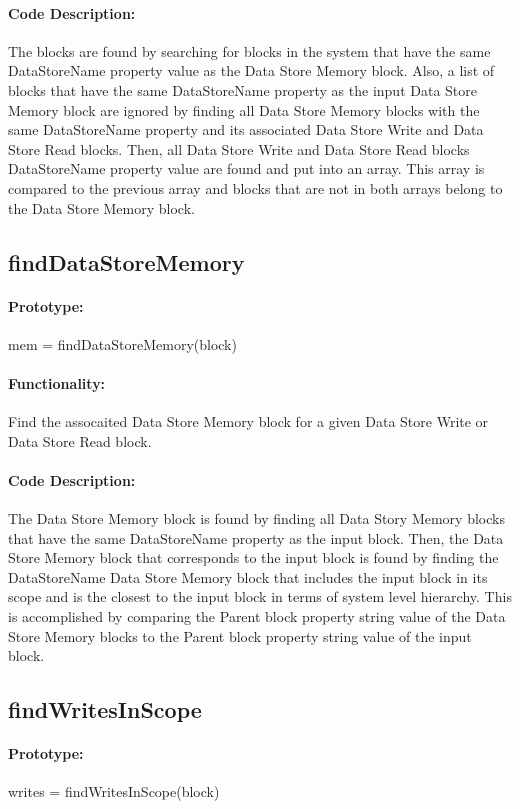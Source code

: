 \documentclass[12pt,letterpaper]{report}
\begin{document}
\paragraph{Code Description:} The blocks are found by searching for blocks in the system that have the same DataStoreName property value as the Data Store Memory block. Also, a list of blocks that have the same DataStoreName property as the input Data Store Memory block are ignored by finding all Data Store Memory blocks with the same DataStoreName property and its associated Data Store Write and Data Store Read blocks. Then, all Data Store Write and Data Store Read blocks DataStoreName property value are found and put into an array. This array is compared to the previous array and blocks that are not in both arrays belong to the Data Store Memory block.

\subsection{findDataStoreMemory}
\paragraph{Prototype:} mem = findDataStoreMemory(block)
\paragraph{Functionality:} Find the assocaited Data Store Memory block for a given Data Store Write or Data Store Read block.
\paragraph{Code Description:} The Data Store Memory block is found by finding all Data Story Memory blocks that have the same DataStoreName property as the input block. Then, the Data Store Memory block that corresponds to the input block is found by finding the DataStoreName Data Store Memory block that includes the input block in its scope and is the closest to the input block in terms of system level hierarchy. This is accomplished by comparing the Parent block property string value of the Data Store Memory blocks to the Parent block property string value of the input block.

\subsection{findWritesInScope}
\paragraph{Prototype:} writes = findWritesInScope(block)
\end{document}
